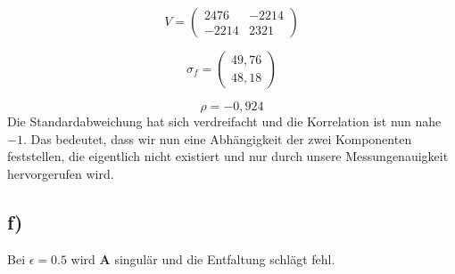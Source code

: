 \begin{equation}
    V = \left(\begin{matrix}
            2476  & -2214\\
            -2214 & 2321
        \end{matrix}\right)
\end{equation}

\begin{equation}
    \sigma_f = \left(\begin{matrix}
                    49,76\\
                    48,18
                \end{matrix}\right)
\end{equation}

\begin{equation}
    \rho = -0,924
\end{equation}
Die Standardabweichung hat sich verdreifacht und die Korrelation ist nun nahe $-1$.
Das bedeutet, dass wir nun eine Abhängigkeit der zwei Komponenten feststellen, die eigentlich nicht existiert und nur durch unsere Messungenauigkeit hervorgerufen wird.

\subsection*{f)}
Bei $\epsilon = 0.5$ wird $\mathbf{A}$ singulär und die Entfaltung schlägt fehl.
